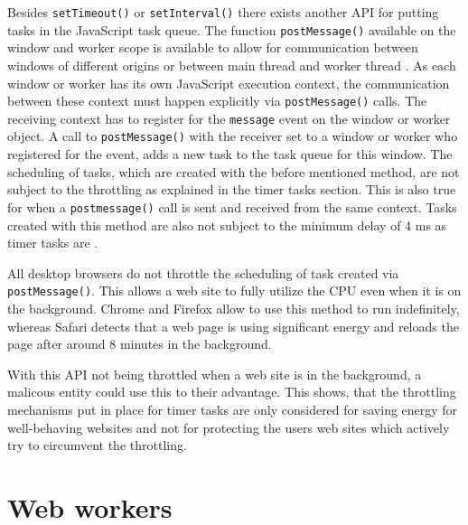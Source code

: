 \documentclass[
	ngerman,
	ruledheaders=section,%
	class=report,%
	thesis={type=bachelor},%
	accentcolor=9c,%
	custommargins=true,%
	marginpar=false,%
	parskip=half-,%
	fontsize=11pt,%
]{tudapub}
\begin{document}
  Besides \texttt{setTimeout()} or \texttt{setInterval()} there exists another API for putting tasks in the JavaScript task queue. The function \texttt{postMessage()} available on the window and worker scope is available to allow for communication between windows of different origins or between main thread and worker thread \cite{mdn-postmessage}. As each window or worker has its own JavaScript execution context, the communication between these context must happen explicitly via \texttt{postMessage()} calls. The receiving context has to register for the \texttt{message} event on the window or worker object. A call to \texttt{postMessage()} with the receiver set to a window or worker who registered for the event, adds a new task to the task queue for this window. The scheduling of tasks, which are created with the before mentioned method, are not subject to the throttling as explained in the timer tasks section. This is also true for when a \texttt{postmessage()} call is sent and received from the same context. Tasks created with this method are also not subject to the minimum delay of 4 ms as timer tasks are \cite{zero-delay-timeouts}.

  All desktop browsers do not throttle the scheduling of task created via \texttt{postMessage()}. This allows a web site to fully utilize the CPU even when it is on the background. Chrome and Firefox allow to use this method to run indefinitely, whereas Safari detects that a web page is using significant energy and reloads the page after around 8 minutes in the background.

  With this API not being throttled when a web site is in the background, a malicous entity could use this to their advantage. This shows, that the throttling mechanisms put in place for timer tasks are only considered for saving energy for well-behaving websites and not for protecting the users web sites which actively try to circumvent the throttling.
  

  
  \section{Web workers}
\end{document}
